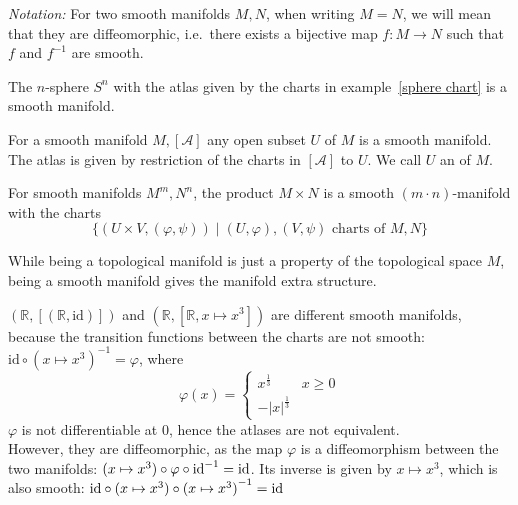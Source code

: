 \documentclass[a4paper,12pt]{article}
\begin{document}
\noindent\textit{Notation:}
    For two smooth manifolds \(M,N\), when writing \(M=N\), we will mean that they are diffeomorphic, i.e.\ there exists a bijective map \(f:M\to N\) such that \(f\) and \(f^{-1}\) are smooth. 


\begin{example}[Spheres]
    The \(n\)-sphere \(S^n\) with the atlas given by the charts in example\ \ref{sphere chart} is a smooth manifold.
\end{example}

\begin{example}
    For a smooth manifold \(M,[\mathcal{A}]\) any open subset \(U\) of \(M\) is a smooth manifold. 
    The atlas is given by restriction of the charts in \([\mathcal{A}]\) to \(U\). 
    We call \(U\) an  of \(M\).
\end{example}

\begin{example}
    For smooth manifolds \(M^m,N^n\), the product \(M\times N\) is a smooth \((m\cdot n)\)-manifold with the charts\[\{(U\times V,(\varphi,\psi))\mid(U,\varphi),(V,\psi)\text{ charts of }M,N\}\]
\end{example}

\begin{remark}
    While being a topological manifold is just a property of the topological space \(M\), being a smooth manifold gives the manifold extra structure.
\end{remark}

\begin{example}
    \((\mathbb{R},[(\mathbb{R},\mathrm{id})])\) and \((\mathbb{R},[\mathbb{R},x\mapsto x^3])\) are different smooth manifolds, because the transition functions between the charts are not smooth: 
    \(\mathrm{id}\circ{(x\mapsto x^3)}^{-1}=\varphi\), where
    \[\varphi(x)=\begin{cases}x^{\frac13} & x\geq0\\ -\lvert x\rvert^{\frac13}\end{cases}\]
    \(\varphi\) is not differentiable at 0, hence the atlases are not equivalent.\\
    However, they are diffeomorphic, as the map \(\varphi\) is a diffeomorphism between the two manifolds: 
    \((x\mapsto x^3)\circ \varphi\circ \mathrm{id}^{-1}= \mathrm{id}\). Its inverse is given by \(x\mapsto x^3\), which is also smooth: \(\mathrm{id}\circ (x\mapsto x^3)\circ{(x\mapsto x^3)}^{-1}=\mathrm{id}\)
\end{example}
\end{document}
